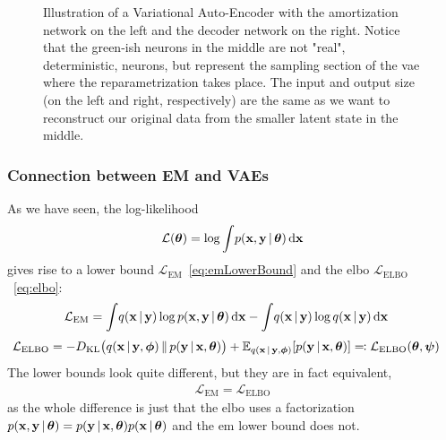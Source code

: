 		\begin{figure}
			\centering
			\tikzVariationalAutoEncoder
			\caption{Illustration of a Variational Auto-Encoder with the amortization network on the left and the decoder network on the right. Notice that the green-ish neurons in the middle are not "real", deterministic, neurons, but represent the sampling section of the \ac{vae} where the reparametrization takes place. The input and output size (on the left and right, respectively) are the same as we want to reconstruct our original data from the smaller latent state in the middle.}
			\label{fig:vae}
		\end{figure}

		\subsubsection{Connection between EM and VAEs}
			As we have seen, the log-likelihood
			\begin{align*}
				\mathcal{L}(\boldsymbol{\mathrm{\theta}}) = \log \int\! p(\boldsymbol{\mathrm{x}}, \boldsymbol{\mathrm{y}} \,\vert\, \boldsymbol{\mathrm{\theta}}) \dd{\boldsymbol{\mathrm{x}}}
			\end{align*}
			gives rise to a lower bound \( \mathcal{L}_\mathrm{EM} \)~\eqref{eq:emLowerBound} and the \ac{elbo} \( \mathcal{L}_\mathrm{ELBO} \)~\eqref{eq:elbo}:
			\begin{align*}
				\mathcal{L}_\mathrm{EM}
					&= \int\! q(\boldsymbol{\mathrm{x}} \,\vert\, \boldsymbol{\mathrm{y}}) \log p(\boldsymbol{\mathrm{x}}, \boldsymbol{\mathrm{y}} \,\vert\, \boldsymbol{\mathrm{\theta}}) \dd{\boldsymbol{\mathrm{x}}} - \int\! q(\boldsymbol{\mathrm{x}} \,\vert\, \boldsymbol{\mathrm{y}}) \log q(\boldsymbol{\mathrm{x}} \,\vert\, \boldsymbol{\mathrm{y}}) \dd{\boldsymbol{\mathrm{x}}}
			\end{align*}
			\begin{align*}
				\mathcal{L}_\mathrm{ELBO}
					&= -D_\mathrm{KL}\big( q(\boldsymbol{\mathrm{x}} \,\vert\, \boldsymbol{\mathrm{y}}, \boldsymbol{\mathrm{\phi}}) \,\Vert\, p(\boldsymbol{\mathrm{y}} \,\vert\, \boldsymbol{\mathrm{x}}, \boldsymbol{\mathrm{\theta}}) \big) + \mathbb{E}_{q(\boldsymbol{\mathrm{x}} \,\vert\, \boldsymbol{\mathrm{y}}, \boldsymbol{\mathrm{\phi}})}[p(\boldsymbol{\mathrm{y}} \,\vert\, \boldsymbol{\mathrm{x}}, \boldsymbol{\mathrm{\theta}})] \eqqcolon \mathcal{L}_\mathrm{ELBO}(\boldsymbol{\mathrm{\theta}}, \boldsymbol{\mathrm{\psi}})
			\end{align*}
			The lower bounds look quite different, but they are in fact equivalent,
			\begin{align*}
				\mathcal{L}_\mathrm{EM} = \mathcal{L}_\mathrm{ELBO}
			\end{align*}
			as the whole difference is just that the \ac{elbo} uses a factorization \( p(\boldsymbol{\mathrm{x}}, \boldsymbol{\mathrm{y}} \,\vert\, \boldsymbol{\mathrm{\theta}}) = p(\boldsymbol{\mathrm{y}} \,\vert\, \boldsymbol{\mathrm{x}}, \boldsymbol{\mathrm{\theta}}) p(\boldsymbol{\mathrm{x}} \,\vert\, \boldsymbol{\mathrm{\theta}}) \) and the \ac{em} lower bound does not.

